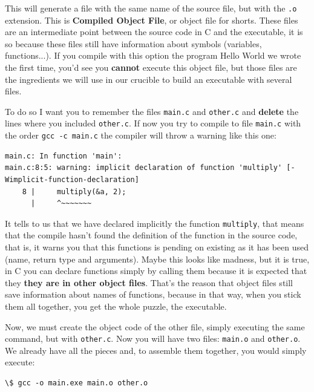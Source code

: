 \documentclass[a4paper]{article}
\begin{document}
This will generate a file with the same name of the source file, but with the
\verb!.o! extension. This is \textbf{Compiled Object File}, or object file for
shorts. These files are an intermediate point between the source code in C and
the executable, it is so because these files still have information about
symbols (variables, functions...). If you compile with this option the program
Hello World we wrote the first time, you'd see you \textbf{cannot} execute
this object file, but those files are the ingredients we will use in our
crucible to build an executable with several files.

To do so I want you to remember the files \verb!main.c! and \verb!other.c! and
\textbf{delete} the lines where you included \verb!other.c!. If now you try to
compile to file \verb!main.c! with the order \verb!gcc -c main.c! the compiler
will throw a warning like this one:

\begin{lstlisting}[style=terminalStyle]
main.c: In function 'main':
main.c:8:5: warning: implicit declaration of function 'multiply' [-Wimplicit-function-declaration]
    8 |     multiply(&a, 2);
      |     ^~~~~~~~
\end{lstlisting}

It tells to us that we have declared implicitly the function \verb!multiply!,
that means that the compile hasn't found the definition of the function in the
source code, that is, it warns you that this functions is pending on existing
as it has been used (name, return type and arguments). Maybe this looks like
madness, but it is true, in C you can declare functions simply by calling them
because it is expected that they \textbf{they are in other object files}.
That's the reason that object files still save information about names of
functions, because in that way, when you stick them all together, you get
the whole puzzle, the executable.

Now, we must create the object code of the other file, simply executing the same
command, but with \verb!other.c!. Now you will have two files: \verb!main.o! and
\verb!other.o!. We already have all the pieces and, to assemble them together,
you would simply execute:
\begin{lstlisting}[style=terminalStyle]
\$ gcc -o main.exe main.o other.o
\end{lstlisting}
\end{document}
